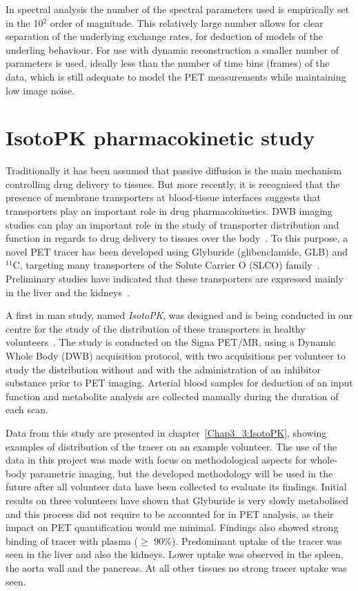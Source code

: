 In spectral analysis the number of the spectral parameters used is empirically set in the 10$^2$ order of magnitude. This relatively large number allows for clear separation of the underlying exchange rates, for deduction of models of the underling behaviour. 
For use with dynamic reconstruction a smaller number of parameters is used, ideally less than the number of time bins (frames) of the data, which is still adequate to model the PET measurements while maintaining low image noise.

\section{IsotoPK pharmacokinetic study}
Traditionally it has been assumed that passive diffusion is the main mechanism controlling drug delivery to tissues. 
But more recently, it is recognised that the presence of membrane transporters at blood-tissue interfaces suggests that transporters play an important role in drug pharmacokinetics. DWB imaging studies can play an important role in the study of transporter distribution and function in regards to drug delivery to tissues over the body~\cite{Marie2017}. 
To this purpose, a novel PET tracer has been developed using Glyburide (glibenclamide, GLB) and $^{11}$C, targeting many transporters of the Solute Carrier O (SLCO) family~\cite{Tournier2013,Caille2020}. Preliminary studies have indicated that these transporters are expressed mainly in the liver and the kidneys~\cite{Tournier2013}.

A first in man study, named \textit{IsotoPK}, was designed and is being conducted in our centre for the study of the distribution of these transporters in healthy volunteers~\cite{Marie2019}.
The study is conducted on the Signa PET/MR, using a Dynamic Whole Body (DWB) acquisition protocol, with two acquisitions per volunteer to study the distribution without and with the administration of an inhibitor substance prior to PET imaging.
Arterial blood samples for deduction of an input function and metabolite analysis are collected manually during the duration of each scan. 

Data from this study are presented in chapter~\ref{Chap3_3:IsotoPK}, showing examples of distribution of the tracer on an example volunteer. The use of the data in this project was made with focus on methodological aspects for whole-body parametric imaging, but the developed methodology will be used in the future after all volunteer data have been collected to evaluate its findings.
Initial results on three volunteers have shown that Glyburide is very slowly metabolised and this process did not require to be accounted for in PET analysis, as their impact on PET quantification would me minimal. Findings also showed strong binding of tracer with plasma ($\geq$ 90\%).
Predominant uptake of the tracer was seen in the liver and also the kidneys. Lower uptake was observed in the spleen, the aorta wall and the pancreas. At all other tissues no strong tracer uptake was seen.

